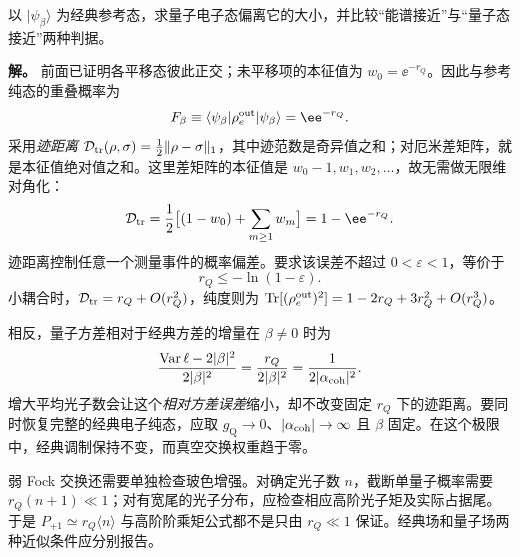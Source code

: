 \begin{exbox}[经典纯态近似的误差怎样随耦合缩小]
以 $|\psi_\beta\rangle$ 为经典参考态，求量子电子态偏离它的大小，并比较“能谱接近”与“量子态接近”两种判据。

\textbf{解。} 前面已证明各平移态彼此正交；未平移项的本征值为 $w_0=\ee^{-r_Q}$。因此与参考纯态的重叠概率为
\begin{equation*}
 F_\beta\equiv\langle\psi_\beta|\rho_e^{\rm out}|\psi_\beta\rangle
 =\ee^{-r_Q}.
\end{equation*}
采用\emph{迹距离} $\mathcal D_{\rm tr}(\rho,\sigma)=\tfrac12\|\rho-\sigma\|_1$，其中迹范数是奇异值之和；对厄米差矩阵，就是本征值绝对值之和。这里差矩阵的本征值是 $w_0-1,w_1,w_2,\ldots$，故无需做无限维对角化：
\begin{equation*}
 \mathcal D_{\rm tr}
 =\frac12\bigl[(1-w_0)+\sum_{m\ge1}w_m\bigr]
 =1-\ee^{-r_Q}.
\end{equation*}
迹距离控制任意一个测量事件的概率偏差。要求该误差不超过 $0<\varepsilon<1$，等价于
\begin{equation*}
 r_Q\le-\ln(1-\varepsilon).
\end{equation*}
小耦合时，$\mathcal D_{\rm tr}=r_Q+O(r_Q^2)$，纯度则为
$\operatorname{Tr}[(\rho_e^{\rm out})^2]=1-2r_Q+3r_Q^2+O(r_Q^3)$。

相反，量子方差相对于经典方差的增量在 $\beta\ne0$ 时为
\begin{equation*}
 \frac{\operatorname{Var}\ell-2|\beta|^2}{2|\beta|^2}
 =\frac{r_Q}{2|\beta|^2}
 =\frac1{2|\alpha_{\rm coh}|^2}.
\end{equation*}
增大平均光子数会让这个\emph{相对方差误差}缩小，却不改变固定 $r_Q$ 下的迹距离。要同时恢复完整的经典电子纯态，应取 $g_{\mathrm Q}\to0$、$|\alpha_{\rm coh}|\to\infty$ 且 $\beta$ 固定。在这个极限中，经典调制保持不变，而真空交换权重趋于零。
\end{exbox}

弱 Fock 交换还需要单独检查玻色增强。对确定光子数 $n$，截断单量子概率需要 $r_Q(n+1)\ll1$；对有宽尾的光子分布，应检查相应高阶光子矩及实际占据尾。于是 $P_{+1}\simeq r_Q\langle n\rangle$ 与高阶阶乘矩公式都不是只由 $r_Q\ll1$ 保证。经典场和量子场两种近似条件应分别报告。

